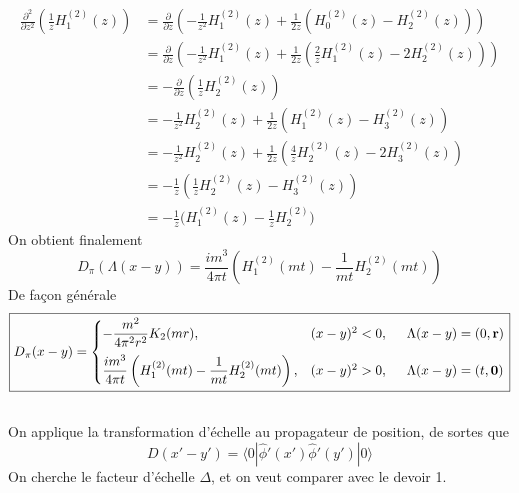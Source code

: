 \documentclass{article}
\numberwithin{equation}{section}
\begin{document}
\begin{align*}
        \frac{\partial^{2}}{\partial z^2} \left( \frac{1}{z}H_{1}^{(2)}(z) \right) 
        &= \frac{\partial }{\partial z} \left( 
                - \frac{1}{z^2}H_{1}^{(2)}(z) + \frac{1}{2z} \left( H_{0}^{(2)}(z) - H_{2}^{(2)}(z) \right) 
        \right)\\
        &= \frac{\partial }{\partial z} \left( 
                - \frac{1}{z^2}H_{1}^{(2)}(z) + \frac{1}{2z} \left( \frac{2}{z}H_1^{(2)}(z) - 2H_{2}^{(2)}(z) \right) 
        \right) \\
        &= -\frac{\partial }{\partial z} \left( 
                 \frac{1}{z} H_{2}^{(2)}(z) 
         \right)  \\
         &= -\frac{1}{z^{2}}H_2^{(2)}(z) + \frac{1}{2z} \left( H_1^{(2)}(z) - H_3^{(2)}(z) \right) \\
         &= -\frac{1}{z^{2}}H_2^{(2)}(z) + \frac{1}{2z} \left( \frac{4}{z}H_{2}^{(2)}(z) - 2H_3^{(2)}(z) \right) \\
         &= -\frac{1}{z} \left( \frac{1}{z} H_2^{(2)}(z) - H_{3}^{(2)}(z) \right) \\
         &= -\frac{1}{z}\bigg(H_{1}^{(2)}(z) - \frac{1}{z}H_2^{(2)}\bigg)
\end{align*}
On obtient finalement
\begin{equation}
        \boxed{D_{\pi}(\Lambda(x - y)) = \frac{im^3}{4\pi t} \left( H_{1}^{(2)}(mt) - \frac{1}{mt}H_{2}^{(2)}(mt) \right) }
\end{equation} 
De façon générale
\begin{equation}
        \boxed{
        D_{\pi}(x - y) = \begin{cases}
                -\dfrac{m^2}{4\pi^2r^2} K_2(mr),  & (x - y)^{2} < 0, \hspace{0.5cm} \Lambda(x - y) = (0, \mathbf{r}) \\[2ex]
                 \dfrac{im^3}{4\pi t} \left( H_{1}^{(2)}(mt) - \dfrac{1}{mt}H_{2}^{(2)}(mt) \right),  & (x - y)^{2} > 0, \hspace{0.5cm} \Lambda(x - y) = (t, \mathbf{0})
        \end{cases}
}
\end{equation} 


\subsection{}
On applique la transformation d'échelle au propagateur de position, de sortes que
\begin{equation}
        D(x' - y') = \langle 0 | \hat{\phi}'(x') \hat{\phi}'(y') | 0 \rangle 
\end{equation} 
On cherche le facteur d'échelle $\Delta$, et on veut comparer avec le devoir 1.
\end{document}
